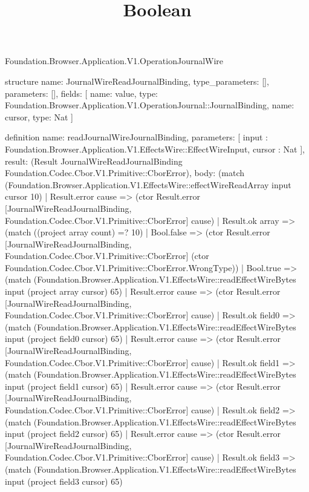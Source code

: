 \begin{lexlean}{Foundation.Browser.Application.V1.OperationJournalWire}
\title{Boolean}
\begin{semanticmodule}
structure{
  name: JournalWireReadJournalBinding,
  type_parameters: [],
  parameters: [],
  fields: [
    {name: value, type: Foundation.Browser.Application.V1.OperationJournal::JournalBinding},
    {name: cursor, type: Nat}
  ]
}

definition{
  name: readJournalWireJournalBinding,
  parameters: [
    input : Foundation.Browser.Application.V1.EffectsWire::EffectWireInput,
    cursor : Nat
  ],
  result: (Result JournalWireReadJournalBinding Foundation.Codec.Cbor.V1.Primitive::CborError),
  body: (match (Foundation.Browser.Application.V1.EffectsWire::effectWireReadArray input cursor 10)
    | Result.error cause => (ctor Result.error [JournalWireReadJournalBinding, Foundation.Codec.Cbor.V1.Primitive::CborError] cause)
    | Result.ok array => (match ((project array count) =? 10)
      | Bool.false => (ctor Result.error [JournalWireReadJournalBinding, Foundation.Codec.Cbor.V1.Primitive::CborError] (ctor Foundation.Codec.Cbor.V1.Primitive::CborError.WrongType))
      | Bool.true => (match (Foundation.Browser.Application.V1.EffectsWire::readEffectWireBytes input (project array cursor) 65)
        | Result.error cause => (ctor Result.error [JournalWireReadJournalBinding, Foundation.Codec.Cbor.V1.Primitive::CborError] cause)
        | Result.ok field0 => (match (Foundation.Browser.Application.V1.EffectsWire::readEffectWireBytes input (project field0 cursor) 65)
          | Result.error cause => (ctor Result.error [JournalWireReadJournalBinding, Foundation.Codec.Cbor.V1.Primitive::CborError] cause)
          | Result.ok field1 => (match (Foundation.Browser.Application.V1.EffectsWire::readEffectWireBytes input (project field1 cursor) 65)
            | Result.error cause => (ctor Result.error [JournalWireReadJournalBinding, Foundation.Codec.Cbor.V1.Primitive::CborError] cause)
            | Result.ok field2 => (match (Foundation.Browser.Application.V1.EffectsWire::readEffectWireBytes input (project field2 cursor) 65)
              | Result.error cause => (ctor Result.error [JournalWireReadJournalBinding, Foundation.Codec.Cbor.V1.Primitive::CborError] cause)
              | Result.ok field3 => (match (Foundation.Browser.Application.V1.EffectsWire::readEffectWireBytes input (project field3 cursor) 65)
}
\end{semanticmodule}
\end{lexlean}
